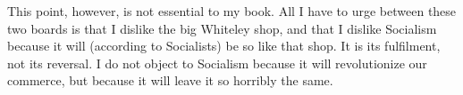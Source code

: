 \documentclass[final,10pt,letterpaper,twocolumn,openany]{book}
\begin{document}
This point, however, is not essential to my book. All I have to urge
between these two boards is that I dislike the big Whiteley shop, and that I
dislike Socialism because it will (according to Socialists) be so like that
shop. It is its fulfilment, not its reversal. I do not object to Socialism
because it will revolutionize our commerce, but because it will leave it so
horribly the same.
\end{document}
